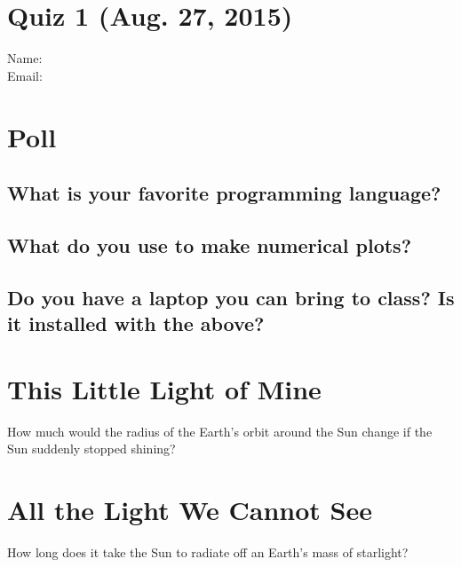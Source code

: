 \documentclass[11pt]{article}
\begin{document}
\pagestyle{empty}
\parindent=0pt

\section*{\centering Quiz 1 (Aug. 27, 2015)}

{\large
Name:\\
Email:\\
}

\section{Poll}
\subsection{What is your favorite programming language?}
\vspace{0.25in}
\subsection{What do you use to make numerical plots?}
\vspace{0.25in}
\subsection{Do you have a laptop you can bring to class? Is it installed with the above?}
\vspace{0.25in}

\section{This Little Light of Mine}

How much would the radius of the Earth's orbit around the Sun change if the Sun suddenly stopped shining?
\vspace{2.5in}

\section{All the Light We Cannot See}

How long does it take the Sun to radiate off an Earth's mass of starlight?
\vspace{2.5in}
\end{document}
